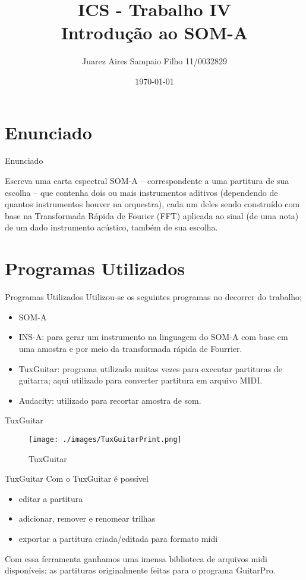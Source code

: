 \documentclass{beamer}
\title[Introdução a Computação Sônica]{ ICS - Trabalho IV \\ Introdução ao SOM-A}
\author{Juarez Aires Sampaio Filho 11/0032829}
\institute{Universidade de Brasília}
\date{\today}
\begin{document}
\begin{frame}
        \titlepage
\end{frame}

\AtBeginSection[]
{
}
\section{Enunciado}
\begin{frame}{Enunciado}
	\begin{block}{}
		Escreva uma carta espectral SOM-A -- correspondente a uma partitura de sua escolha -- 
que contenha dois ou mais instrumentos aditivos (dependendo de quantos instrumentos 
houver na orquestra), cada um deles sendo construído com base na Transformada Rápida 
de Fourier (FFT) aplicada ao sinal (de uma nota) de um dado instrumento acústico, também 
de sua escolha.
	\end{block}
\end{frame}

\section{Programas Utilizados}
\begin{frame}{Programas Utilizados}
Utilizou-se os seguintes programas no decorrer do trabalho;
\begin{itemize}
	\item SOM-A 
	\item INS-A: para gerar um instrumento na linguagem do SOM-A com base em uma amostra
	e por meio da transformada rápida de Fourrier.
	\item TuxGuitar: programa utilizado muitas vezes para executar partituras de guitarra; aqui utilizado para converter partitura em arquivo MIDI.
	\item Audacity: utilizado para recortar amostra de som.
\end{itemize}

\end{frame}


\begin{frame}{TuxGuitar}
\begin{figure}
	\texttt{[image: ./images/TuxGuitarPrint.png]}
	\caption{TuxGuitar}
\end{figure}
\end{frame}

\begin{frame}{TuxGuitar}
	Com o TuxGuitar é possível	
	\begin{itemize}
		\item editar a partitura
		\item adicionar, remover e renomear trilhas
		\item exportar a partitura criada/editada para formato midi
	\end{itemize}

	Com essa ferramenta ganhamos uma imensa biblioteca de arquivos midi disponíveis:
	as partituras originalmente feitas para o programa GuitarPro. 	
	
\end{frame}
\end{document}
